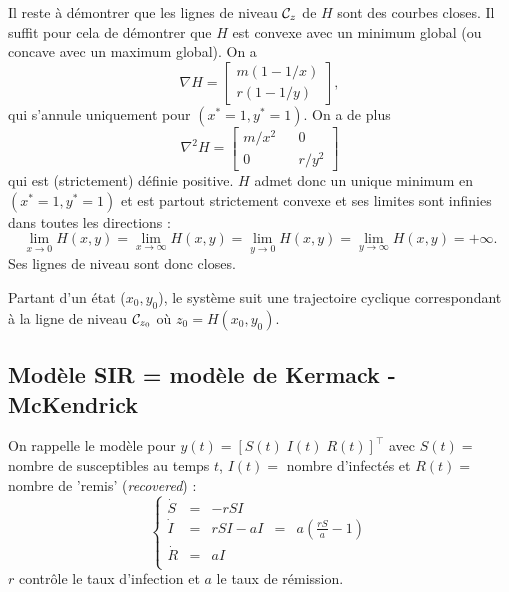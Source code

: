 \bigskip
Il reste à démontrer que les lignes de niveau $\mathcal{C}_z$ de $H$ sont des courbes closes. Il suffit pour cela de démontrer que $H$ est convexe avec un minimum global (ou concave avec un maximum global). On a
$$
\nabla H = \left[\begin{array}{c} m(1 - 1/x) \\ r(1 - 1/y)\end{array}\right], 
$$
qui s'annule uniquement pour $(x^* = 1, y^*=1)$. On a de plus
$$
\nabla^2 H = \left[\begin{array}{ccc} m/x^2 & & 0 \\ 0 & & r/y^2 \end{array}\right] 
$$
qui est (strictement) définie positive.
$H$ admet donc un unique minimum en $(x^* = 1, y^*=1)$ et est partout strictement convexe et ses limites sont infinies dans toutes les directions : 
$$
\lim_{x \to 0} H(x, y) = \lim_{x \to \infty} H(x, y) =
\lim_{y \to 0} H(x, y) = \lim_{y \to \infty} H(x, y) =
+ \infty.
$$
Ses lignes de niveau sont donc closes.

\bigskip
Partant d'un état ($x_0, y_0$), le système suit une trajectoire cyclique 
correspondant à la ligne de niveau $\mathcal{C}_{z_0}$ où $z_0 = H(x_0, y_0)$.


\subsection{Modèle SIR = modèle de Kermack - McKendrick}

On rappelle le modèle pour $y(t) = [S(t) \; I(t) \; R(t)]^\top$ avec $S(t) =$ nombre de susceptibles au temps $t$, $I(t) =$ nombre d'infectés et $R(t) =$ nombre de 'remis' ({\em recovered}) :
$$
\left\{ \begin{array}{rclcl} 
\dot S & = & - r S I \\
\dot I & = & r S I - a I & = & \displaystyle{a \left(\frac{rS}a  - 1\right)} \\
\dot R & = & a I \\
\end{array} \right.
$$
$r$ contrôle le taux d'infection et $a$ le taux de rémission.

